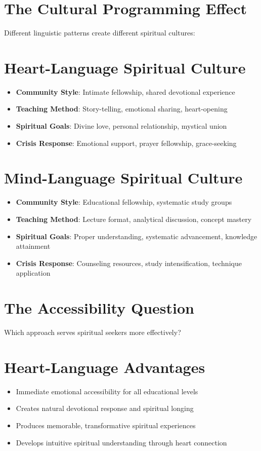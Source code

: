 \documentclass[11pt,twoside]{book}
\begin{document}
\section*{The Cultural Programming Effect}
\label{sec:org916e3d4}

Different linguistic patterns create different spiritual cultures:
\section*{Heart-Language Spiritual Culture}
\label{sec:org70b1619}
\begin{itemize}
\item \textbf{\textbf{Community Style}}: Intimate fellowship, shared devotional experience
\item \textbf{\textbf{Teaching Method}}: Story-telling, emotional sharing, heart-opening
\item \textbf{\textbf{Spiritual Goals}}: Divine love, personal relationship, mystical union
\item \textbf{\textbf{Crisis Response}}: Emotional support, prayer fellowship, grace-seeking
\end{itemize}
\section*{Mind-Language Spiritual Culture}
\label{sec:org04fbd9e}
\begin{itemize}
\item \textbf{\textbf{Community Style}}: Educational fellowship, systematic study groups
\item \textbf{\textbf{Teaching Method}}: Lecture format, analytical discussion, concept mastery
\item \textbf{\textbf{Spiritual Goals}}: Proper understanding, systematic advancement, knowledge attainment
\item \textbf{\textbf{Crisis Response}}: Counseling resources, study intensification, technique application
\end{itemize}
\section*{The Accessibility Question}
\label{sec:orgd3c4e01}

Which approach serves spiritual seekers more effectively?
\section*{Heart-Language Advantages}
\label{sec:org73a7622}
\begin{itemize}
\item Immediate emotional accessibility for all educational levels
\item Creates natural devotional response and spiritual longing
\item Produces memorable, transformative spiritual experiences
\item Develops intuitive spiritual understanding through heart connection
\end{itemize}
\end{document}
